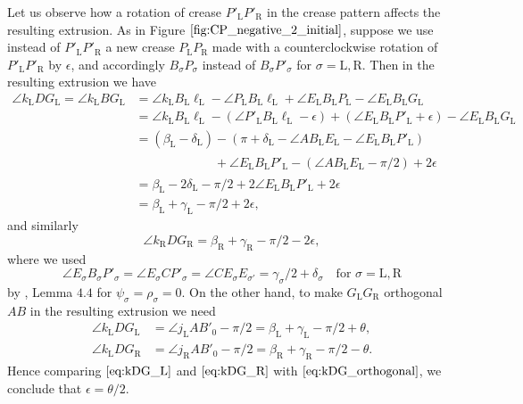 \documentclass[11pt]{amsart}
\numberwithin{equation}{section}
\numberwithin{theorem}{section}
\newcommand{\Lt}{\ensuremath{\mathrm{L}}}
\newcommand{\Rt}{\ensuremath{\mathrm{R}}}
\begin{document}
Let us observe how a rotation of crease $P'_\Lt P'_\Rt$ in the crease pattern affects the resulting extrusion.
As in Figure $\ref{fig:CP_negative_2_initial}$, suppose we use instead of $P'_\Lt P'_\Rt$
a new crease $P_\Lt P_\Rt$ made with a counterclockwise rotation of $P'_\Lt P'_\Rt$ by $\epsilon$,
and accordingly $B_\sigma P_\sigma$ instead of $B_\sigma P'_\sigma$ for $\sigma =\Lt ,\Rt$.
Then in the resulting extrusion we have
\begin{equation}\label{eq:kDG_L}
\begin{aligned}
\angle k_\Lt DG_\Lt =\angle k_\Lt BG_\Lt&=\angle k_\Lt B_\Lt \ell_\Lt -\angle P_\Lt B_\Lt\ell_\Lt +\angle E_\Lt B_\Lt P_\Lt -\angle E_\Lt B_\Lt G_\Lt\\
&=\angle k_\Lt B_\Lt \ell_\Lt -(\angle P'_\Lt B_\Lt\ell_\Lt -\epsilon )+(\angle E_\Lt B_\Lt P'_\Lt +\epsilon )-\angle E_\Lt B_\Lt G_\Lt\\
&=(\beta_\Lt -\delta_\Lt )-(\pi +\delta_\Lt -\angle AB_\Lt E_\Lt -\angle E_\Lt B_\Lt P'_\Lt )\\
&\phantom{{}=(\beta_\Lt -\delta_\Lt )}+\angle E_\Lt B_\Lt P'_\Lt -(\angle AB_\Lt E_\Lt -\pi /2)+2\epsilon\\
&=\beta_\Lt -2\delta_\Lt -\pi /2+2\angle E_\Lt B_\Lt P'_\Lt +2\epsilon\\
&=\beta_\Lt +\gamma_\Lt -\pi /2+2\epsilon ,
\end{aligned}
\end{equation}
and similarly
\begin{equation}\label{eq:kDG_R}
\angle k_\Rt DG_\Rt =\beta_\Rt +\gamma_\Rt -\pi /2-2\epsilon ,
\end{equation}
where we used 
\begin{equation*}
\angle E_\sigma B_\sigma P'_\sigma =\angle E_\sigma CP'_\sigma =\angle CE_\sigma E_{\sigma'}=\gamma_\sigma /2+\delta_\sigma\quad\text{for }\sigma =\Lt ,\Rt
\end{equation*}
by \cite{Doi20}, Lemma $4.4$ for $\psi_\sigma =\rho_\sigma =0$.
On the other hand, to make $G_\Lt G_\Rt$ orthogonal $AB$ in the resulting extrusion we need
\begin{equation}\label{eq:kDG_orthogonal}
\begin{aligned}
\angle k_\Lt DG_\Lt&=\angle j_\Lt AB'_0-\pi /2=\beta_\Lt +\gamma_\Lt -\pi /2+\theta ,\\
\angle k_\Lt DG_\Rt&=\angle j_\Rt AB'_0-\pi /2=\beta_\Rt +\gamma_\Rt -\pi /2-\theta .
\end{aligned}
\end{equation}
Hence comparing $\eqref{eq:kDG_L}$ and $\eqref{eq:kDG_R}$ with $\eqref{eq:kDG_orthogonal}$, we conclude that $\epsilon =\theta /2$.
\end{document}
